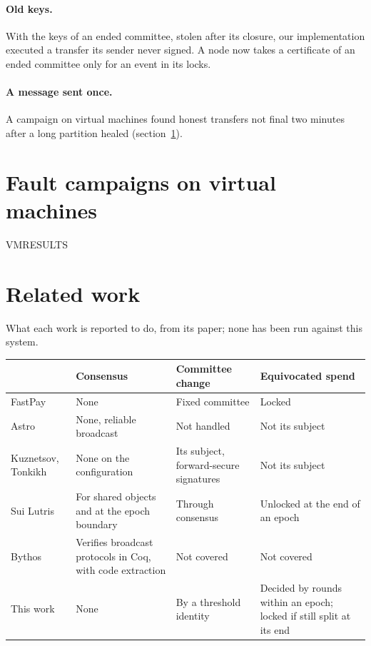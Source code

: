 \documentclass[10pt,a4paper]{article}
\begin{document}
\paragraph{Old keys.} With the keys of an ended committee, stolen after its closure, our implementation
executed a transfer its sender never signed. A node now takes a certificate of an ended committee only
for an event in its locks.

\paragraph{A message sent once.} A campaign on virtual machines found honest transfers not final two
minutes after a long partition healed (section~\ref{sec:vm}).

\section{Fault campaigns on virtual machines}\label{sec:vm}

VMRESULTS

\section{Related work}

What each work is reported to do, from its paper; none has been run against this system.

\begin{center}\small
\begin{tabularx}{\textwidth}{@{}p{}LLL@{}}
\toprule
& Consensus & Committee change & Equivocated spend \\
\midrule
FastPay & None & Fixed committee & Locked \\
Astro & None, reliable broadcast & Not handled & Not its subject \\
Kuznetsov, Tonkikh & None on the configuration & Its subject, forward-secure signatures & Not its subject \\
Sui Lutris & For shared objects and at the epoch boundary & Through consensus & Unlocked at the end of an epoch \\
Bythos & Verifies broadcast protocols in Coq, with code extraction & Not covered & Not covered \\
This work & None & By a threshold identity & Decided by rounds within an epoch; locked if still split at its end \\
\bottomrule
\end{tabularx}
\end{center}
\end{document}
